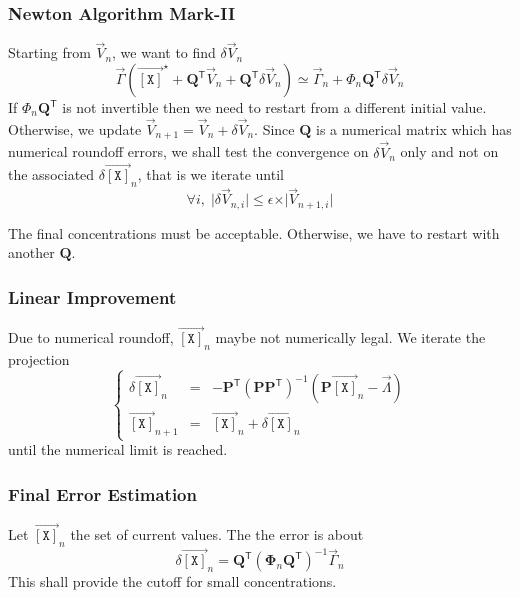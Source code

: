 \documentclass[aps,twocolumn]{revtex4}
\newcommand{\myconc}[1]{\left\lbrack #1 \right\rbrack}
\newcommand{\mychem}[1]{{\mathtt{#1}}}
\newcommand{\mymat}[1]{\boldsymbol{#1}}
\newcommand{\mytrn}[1]{{#1}^{\mathsf{T}}}
\newcommand{\myvec}[1]{\overrightarrow{#1}}
\newcommand{\vecX}{\myvec{\myconc{\mychem{X}}}}
\begin{document}
\subsubsection{Newton Algorithm Mark-II}
Starting from $\vec{V}_{n}$, we want to find $\delta\vec{V}_n$
\begin{equation}
	\vec{\Gamma}\left(\vecX^\star +  \mytrn{\mymat{Q}}\vec{V}_n + \mytrn{\mymat{Q}}\delta\vec{V}_n\right)
	\simeq \vec{\Gamma}_{n} + \Phi_n  \mytrn{\mymat{Q}} \delta\vec{V}_n
\end{equation}
If $\Phi_n  \mytrn{\mymat{Q}}$ is not invertible then we need to restart from a different initial value.\\
Otherwise, we update $\vec{V}_{n+1}= \vec{V}_{n} + \delta\vec{V}_{n}$.
Since $\mymat{Q}$ is a numerical matrix which has numerical roundoff errors, we shall test the convergence
 on $\delta\vec{V}_{n}$ only and not on the associated $\delta \vecX_n$, that is
we iterate until
\begin{equation}
	\forall i, \; \vert\delta\vec{V}_{n,i}\vert \leq \epsilon \times \vert \vec{V}_{n+1,i}\vert
\end{equation}

The final concentrations must be acceptable. Otherwise,  we have to restart with another $\mymat{Q}$.


\subsubsection{Linear Improvement}
Due to numerical roundoff, $\vecX_n$ maybe not numerically legal.
We iterate the projection
\begin{equation}
	\left\lbrace
	\begin{array}{rcl}
	\delta \vecX_n & = & - \mytrn{\mymat{P}} \left(\mymat{P} \mytrn{\mymat{P}}\right)^{-1} \left( \mymat{P}\vecX_n - \vec{\Lambda} \right)\\
	\vecX_{n+1}    & = & \vecX_n + \delta\vecX_n
	\end{array}
	\right.
\end{equation}
until the numerical limit is reached.

\subsubsection{Final Error Estimation}
Let $\vecX_n$ the set of current values. The the error is about
\begin{equation}
	\delta \vecX_n = \mytrn{\mymat{Q}}\left(\mymat{\Phi}_n\mytrn{\mymat{Q}}\right)^{-1} \vec{\Gamma}_n
\end{equation}
This shall provide the cutoff for small concentrations.
\end{document}
